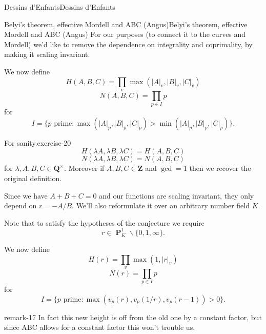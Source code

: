 \documentclass[10pt,]{book}
\numberwithin{equation}{section}
\newcommand{\units}{^{\times}}
\newcommand{\ZZ}{\mathbf{Z}}
\newcommand{\QQ}{\mathbf{Q}}
\DeclareMathOperator{\PP}{\mathbf{P}}
\newcommand{\gt}{>}
\begin{document}
\begin{chapterptx}{Dessins d'Enfants}{}{Dessins d'Enfants}{}{}
\begin{sectionptx}{Belyi's theorem, effective Mordell and ABC (Angus)}{}{Belyi's theorem, effective Mordell and ABC (Angus)}{}{}
\hypertarget{p-673}{}%
For our purposes (to connect it to the curves and Mordell) we'd like to remove the dependence on integrality and coprimality, by making it scaling invariant.%
\par
\hypertarget{p-674}{}%
We now define%
\begin{equation*}
H(A,B,C) = \prod_{v}\max(|A|_v,|B|_v,|C|_v)
\end{equation*}
%
\begin{equation*}
N(A,B,C) =  \prod_{p\in I} p
\end{equation*}
for%
\begin{equation*}
I = \{p \text{ prime} : \max(|A|_p,|B|_p,|C|_p) \gt \min(|A|_p,|B|_p,|C|_p)\}\text{.}
\end{equation*}
%
\begin{inlineexercise}{For sanity.}{exercise-20}%
\hypertarget{p-675}{}%
%
\begin{equation*}
H(\lambda A,\lambda B,\lambda C)  = H(A,B,C)
\end{equation*}
%
\begin{equation*}
N(\lambda A,\lambda B,\lambda C)  = N(A,B,C)
\end{equation*}
for \(\lambda, A,B,C \in \QQ\units\). Moreover if \(A,B,C \in \ZZ\) and \(\gcd = 1\) then we recover the original definition.%
\end{inlineexercise}
\hypertarget{p-676}{}%
Since we have \(A+ B+C = 0\) and our functions are scaling invariant, they only depend on \(r=  - A/B\). We'll also reformulate it over an arbitrary number field \(K\).%
\par
\hypertarget{p-677}{}%
Note that to satisfy the hypotheses of the conjecture we require%
\begin{equation*}
r \in \PP^1_K \smallsetminus \{0,1,\infty\}\text{.}
\end{equation*}
%
\par
\hypertarget{p-678}{}%
We now define%
\begin{equation*}
H(r) = \prod_{v}\max(1,|r|_v)
\end{equation*}
%
\begin{equation*}
N(r) =  \prod_{p\in I} p
\end{equation*}
for%
\begin{equation*}
I = \{p \text{ prime} : \max(v_p(r), v_p(1/r), v_p(r-1)) \gt 0                      \}\text{.}
\end{equation*}
%
\begin{remark}{}{remark-17}%
\hypertarget{p-679}{}%
In fact this new height is off from the old one by a constant factor, but since ABC allows for a constant factor this won't trouble us.%

\end{remark}
\end{sectionptx}
\end{chapterptx}
\end{document}

